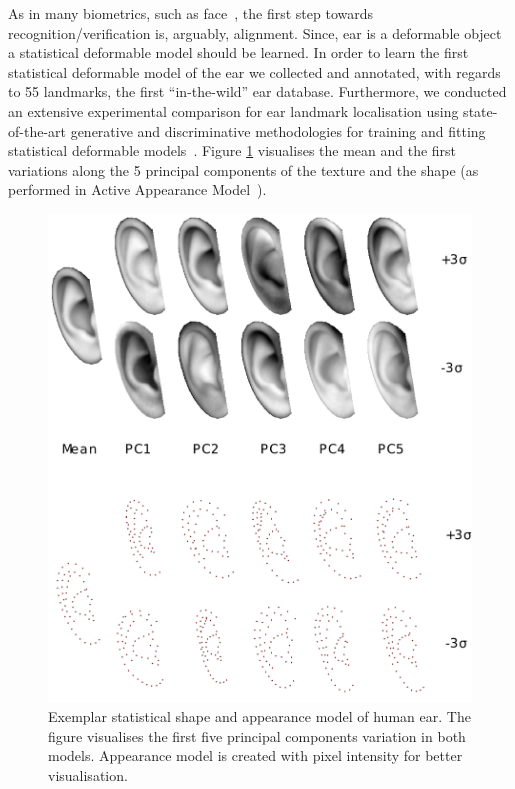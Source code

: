 As in many biometrics, such as face~\cite{taigman2014deepface}, the first step towards recognition/verification is, arguably, alignment. Since, ear is a deformable object a statistical deformable model should be learned. In order to learn the first statistical deformable model of the ear we collected and annotated, with regards to 55 landmarks, the first ``in-the-wild'' ear database. Furthermore, we conducted an extensive experimental comparison for ear landmark localisation using state-of-the-art generative and discriminative methodologies  for training and fitting statistical deformable models~\cite{Cootes1995, Cootes2001, Matthews2004, Saragih2011, Belhumeur2011, Zhu2012,Cao2012, Asthana2013, Tzimiropoulos2014, Asthana2014, antonakos2015feature}. Figure \ref{fig:aam_model} visualises the mean and the first variations along the 5 principal components of the texture and the shape (as performed in Active Appearance Model~\cite{Cootes2001, Matthews2004, Tzimiropoulos2014, antonakos2015feature}).  

\begin{figure}
    \includegraphics[width=\columnwidth]{resources/Ear_Deformable_Model/models/AAM_model}
    \caption{Exemplar statistical shape and appearance model of human ear. The figure visualises the first five principal components variation in both models. Appearance model is created with pixel intensity for better visualisation.}
    \label{fig:aam_model}
\end{figure}


